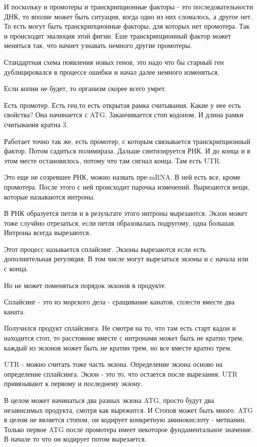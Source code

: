 И поскольку и промотеры и транскрипционные факторы - это 
последовательности ДНК, то вполне может быть ситуация, когда одно из 
них сломалось, а другое нет. То есть могут быть транскрипционные факторы, 
для которых нет промотера. Так и происходит эвалюция этой фигни. 
Еше транскрипционный фактор может меняться так, что начнет узнавать 
немного другие промотеры. 

Стандартная схема появления новых генов, это надо что бы старный 
ген дублицировался в процессе ошибки и начал далее немного изменяться. 

Если копии не будет, то организм скорее всего умрет. 

Есть промотер. Есть ген,то есть открытая рамка считывания. 
Какие у нее есть свойства? 
Она начинается с ATG. Заканчивается стоп кодоном. И длина
рамки считывания кратна 3. 

Работает точно так же, 
есть промотер, с которым связывается транскрипционный фактор. 
Потом садиться полимираза. Дальше синтизируется РНК. И до конца и 
в этом месте остановилось, потому что 
там сигнал конца. 
Там есть UTR. 

Это еще не созревшее РНК, можно 
назвать пре-mRNA. В ней есть 
все, кроме промотера. После этого 
с ней происходит парочка изменений. 
Выризаются вещи, которые называются интроны. 

В РНК образуется петля и в результате этого 
интроны вырезаются. Экзон может тоже случйно отрезаться, 
если петля образовалась подругому, 
одна большая. Интроны всегда вырезаются.

Этот процесс называется сплайсинг. Экзоны вырезаются если есть дополнительная регуляция. 
В том числе могут вырезаться экзоны и с начала или с конца. 

Но не может поменяться порядок экзонов в продукте. 

Сплайсинг - это из морского дела - сращивание канатов, сплести вместе два каната. 

Получился продукт сплайсинга. Не смотря на то, что там есть старт кадон и 
находится стоп, то расстояние вместе с интронами может быть не кратно трем, 
каждый из экзонов может быть не кратин трем, но все 
вместе кратно трем. 

UTR - можно считать тоже часть экзона. Определение экзона осново на 
определение сплайсинга. Экзон - это то, что остается после вырезания. 
UTR привязывают к первому и последнему экзону. 

В целом может начинаться два разных экзона ATG, просто 
будут два независимых продукта, смотря как вырежится. И Стопов 
может быть много. ATG в целом не является стопом, он кодирует 
конкретную аминокислоту - метианин. Только первое ATG после промотера имеет 
некоторое фундаментальное значение. В начале то что он кодирует потом вырезается. 

